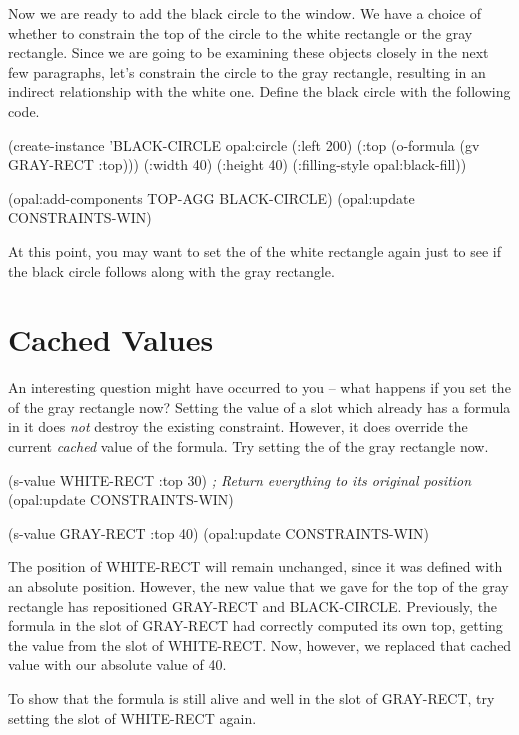 Now we are ready to add the black circle to the window.  We have a
choice of whether to constrain the top of the circle to the white
rectangle or the gray rectangle.  Since we are going to be examining
these objects closely in the next few paragraphs, let's constrain the
circle to the gray rectangle, resulting in an indirect relationship with
the white one.  Define the black circle with the following code.

\begin{programexample}
(create-instance 'BLACK-CIRCLE opal:circle
   (:left 200)
   (:top (o-formula (gv GRAY-RECT :top)))
   (:width 40) (:height 40)
   (:filling-style opal:black-fill))

(opal:add-components TOP-AGG BLACK-CIRCLE)
(opal:update CONSTRAINTS-WIN)
\end{programexample}

At this point, you may want to set the  of the white
rectangle again just to see if the black circle follows along with
the gray rectangle.


\section{Cached Values}

An interesting question might have occurred to
you -- what happens if you set the  of the gray rectangle now?
Setting the value of a slot which already has a formula in it does {\it not}
destroy the existing constraint.  However, it does override the
current {\it cached} value of the formula.  Try setting the  of
the gray rectangle now.

\begin{programexample}
(s-value WHITE-RECT :top 30)  {\it ; Return everything to its original position}
(opal:update CONSTRAINTS-WIN)

(s-value GRAY-RECT :top 40)
(opal:update CONSTRAINTS-WIN)
\end{programexample}

The position of WHITE-RECT will remain unchanged, since it was defined with
an absolute position.  However, the new value that we gave for the top
of the gray rectangle has repositioned GRAY-RECT and BLACK-CIRCLE.
Previously, the formula in the  slot of GRAY-RECT had
correctly computed its own top, getting the value from the 
slot of WHITE-RECT.  Now, however, we replaced that cached value
with our absolute value of 40.

To show that the formula is still alive and well in the  slot
of GRAY-RECT, try setting the  slot of WHITE-RECT again.

